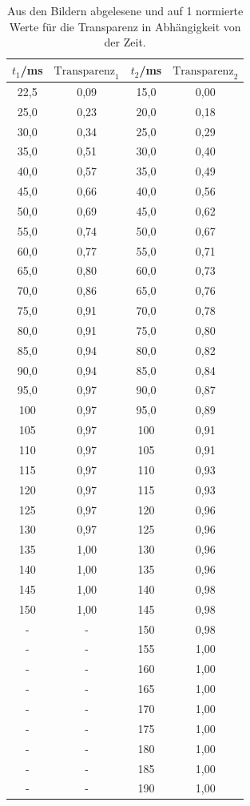 \begin{table}[htp]
	\begin{center}
    \caption{Aus den Bildern abgelesene und auf 1 normierte Werte für die Transparenz in Abhängigkeit von der Zeit.}
    \label{tab:flanke}
		\begin{tabular}{cccc}
		\toprule
			{$t_1$/ms} & {$\text{Transparenz}_1$} & {$t_2$/ms} & {$\text{Transparenz}_2$}\\
			\midrule
			22,5 & 0,09 & 15,0 & 0,00\\
			25,0 & 0,23 & 20,0 & 0,18\\
			30,0 & 0,34 & 25,0 & 0,29\\
			35,0 & 0,51 & 30,0 & 0,40\\
			40,0 & 0,57 & 35,0 & 0,49\\
			45,0 & 0,66 & 40,0 & 0,56\\
			50,0 & 0,69 & 45,0 & 0,62\\
			55,0 & 0,74 & 50,0 & 0,67\\
			60,0 & 0,77 & 55,0 & 0,71\\
			65,0 & 0,80 & 60,0 & 0,73\\
			70,0 & 0,86 & 65,0 & 0,76\\
			75,0 & 0,91 & 70,0 & 0,78\\
			80,0 & 0,91 & 75,0 & 0,80\\
			85,0 & 0,94 & 80,0 & 0,82\\
			90,0 & 0,94 & 85,0 & 0,84\\
			95,0 & 0,97 & 90,0 & 0,87\\
			100 & 0,97 & 95,0 & 0,89\\
			105 & 0,97 & 100 & 0,91\\
			110 & 0,97 & 105 & 0,91\\
			115 & 0,97 & 110 & 0,93\\
			120 & 0,97 & 115 & 0,93\\
			125 & 0,97 & 120 & 0,96\\
			130 & 0,97 & 125 & 0,96\\
			135 & 1,00 & 130 & 0,96\\
			140 & 1,00 & 135 & 0,96\\
			145 & 1,00 & 140 & 0,98\\
			150 & 1,00 & 145 & 0,98\\
			- & - & 150 & 0,98\\
			- & - & 155 & 1,00\\
			- & - & 160 & 1,00\\
			- & - & 165 & 1,00\\
			- & - & 170 & 1,00\\
			- & - & 175 & 1,00\\
			- & - & 180 & 1,00\\
			- & - & 185 & 1,00\\
			- & - & 190 & 1,00\\
		\bottomrule
		\end{tabular}
	\end{center}
\end{table}

